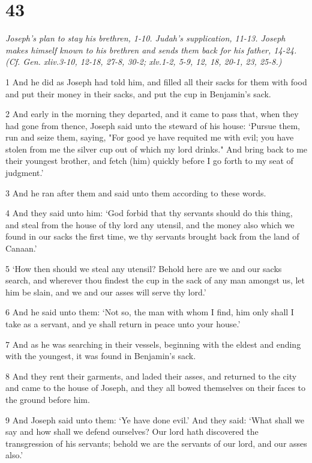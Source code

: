 \chapter{43}

\par \textit{Joseph's plan to stay his brethren, 1-10. Judah's supplication, 11-13. Joseph makes himself known to his brethren and sends them back for his father, 14-24. (Cf. Gen. xliv.3-10, 12-18, 27-8, 30-2; xlv.1-2, 5-9, 12, 18, 20-1, 23, 25-8.)}

\par 1 And he did as Joseph had told him, and filled all their sacks for them with food and put their money in their sacks, and put the cup in Benjamin's sack.
\par 2 And early in the morning they departed, and it came to pass that, when they had gone from thence, Joseph said unto the steward of his house: ‘Pursue them, run and seize them, saying, "For good ye have requited me with evil; you have stolen from me the silver cup out of which my lord drinks." And bring back to me their youngest brother, and fetch (him) quickly before I go forth to my seat of judgment.’
\par 3 And he ran after them and said unto them according to these words.
\par 4 And they said unto him: ‘God forbid that thy servants should do this thing, and steal from the house of thy lord any utensil, and the money also which we found in our sacks the first time, we thy servants brought back from the land of Canaan.’
\par 5 ‘How then should we steal any utensil? Behold here are we and our sacks search, and wherever thou findest the cup in the sack of any man amongst us, let him be slain, and we and our asses will serve thy lord.’
\par 6 And he said unto them: ‘Not so, the man with whom I find, him only shall I take as a servant, and ye shall return in peace unto your house.’
\par 7 And as he was searching in their vessels, beginning with the eldest and ending with the youngest, it was found in Benjamin's sack.
\par 8 And they rent their garments, and laded their asses, and returned to the city and came to the house of Joseph, and they all bowed themselves on their faces to the ground before him.
\par 9 And Joseph said unto them: ‘Ye have done evil.’ And they said: ‘What shall we say and how shall we defend ourselves? Our lord hath discovered the transgression of his servants; behold we are the servants of our lord, and our asses also.’

